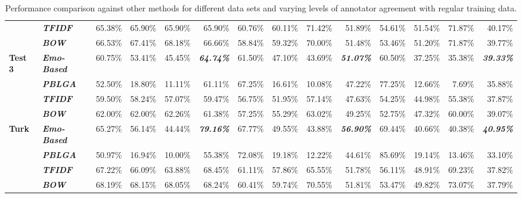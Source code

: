 \documentclass[12pt,a4paper]{report}
\theoremstyle{definition}
\begin{document}
\begin{CJK}{UTF8}{bsmi}
\begin{table}[H]
\begin{tabular}{ll|rrrr|rrrr|rrrr}
\multicolumn{1}{l|}{}                                 & \textit{\textbf{TFIDF}}     & 65.38\% & 65.90\% & 65.90\% & 65.90\% & 60.76\% & 60.11\% & 71.42\% & 51.89\% & 54.61\% & 51.54\% & 71.87\% & 40.17\%\\
\multicolumn{1}{l|}{}                                 & \textit{\textbf{BOW}}       & 66.53\% & 67.41\% & 68.18\% & 66.66\% & 58.84\% & 59.32\% & 70.00\% & 51.48\% & 53.46\% & 51.20\% & 71.87\% & 39.77\%\\ \hline
\multicolumn{1}{l|}{\textbf{Test 3}} & \textit{\textbf{Emo-Based}} & 60.75\% & 53.41\% & 45.45\% & \textit{\textbf{64.74\%}} & 61.50\% & 47.10\% & 43.69\% & \textit{\textbf{51.07\%}} & 60.50\% & 37.25\% & 35.38\% & \textit{\textbf{39.33\%}}\\
\multicolumn{1}{l|}{}                                 & \textit{\textbf{PBLGA}}     & 52.50\% & 18.80\% & 11.11\% & 61.11\% & 67.25\% & 16.61\% & 10.08\% & 47.22\% & 77.25\% & 12.66\% & 7.69\% & 35.88\%\\
\multicolumn{1}{l|}{}                                 & \textit{\textbf{TFIDF}}     & 59.50\% & 58.24\% & 57.07\% & 59.47\% & 56.75\% & 51.95\% & 57.14\% & 47.63\% & 54.25\% & 44.98\% & 55.38\% & 37.87\%\\
\multicolumn{1}{l|}{}                                 & \textit{\textbf{BOW}}       & 62.00\% & 62.00\% & 62.26\% & 61.38\% & 57.25\% & 55.29\% & 63.02\% & 49.25\% & 52.75\% & 47.32\% & 60.00\% & 39.07\%\\ \hline
\multicolumn{1}{l|}{\textbf{Turk}}   & \textit{\textbf{Emo-Based}} & 65.27\% & 56.14\% & 44.44\% & \textit{\textbf{79.16\%}} & 67.77\% & 49.55\% & 43.88\% & \textit{\textbf{56.90\%}} & 69.44\% & 40.66\% & 40.38\% & \textit{\textbf{40.95\%}}\\
\multicolumn{1}{l|}{}                                 & \textit{\textbf{PBLGA}}     & 50.97\% & 16.94\% & 10.00\% & 55.38\% & 72.08\% & 19.18\% & 12.22\% & 44.61\% & 85.69\% & 19.14\% & 13.46\% & 33.10\%\\
\multicolumn{1}{l|}{}                                 & \textit{\textbf{TFIDF}}     & 67.22\% & 66.09\% & 63.88\% & 68.45\% & 61.11\% & 57.86\% & 65.55\% & 51.78\% & 56.11\% & 48.91\% & 69.23\% & 37.82\%\\
\multicolumn{1}{l|}{}                                 & \textit{\textbf{BOW}}       & 68.19\% & 68.15\% & 68.05\% & 68.24\% & 60.41\% & 59.74\% & 70.55\% & 51.81\% & 53.47\% & 49.82\% & 73.07\% & 37.79\%\\ \hline
\end{tabular}
\caption{Performance comparison against other methods for different data sets and varying levels of annotator agreement with regular training data.}
\label{tab:results_regular}
\end{table}
\renewcommand{\arraystretch}{1}
    

\end{CJK}
\end{document}

